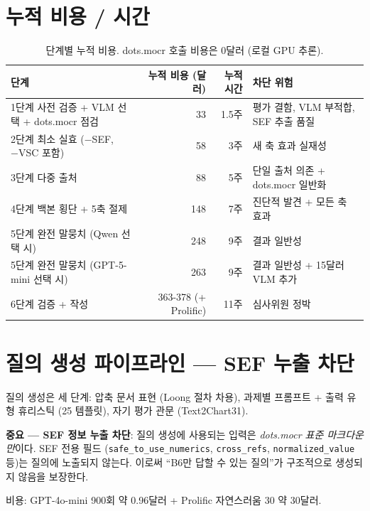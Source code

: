 \documentclass[11pt]{article}
\begin{document}
\section{누적 비용 / 시간}

\begin{table}[h]
\centering
\small
\begin{tabular}{lrrl}
\toprule
단계 & 누적 비용 (달러) & 누적 시간 & 차단 위험 \\
\midrule
1단계 사전 검증 + VLM 선택 + dots.mocr 점검 & 33 & 1.5주 & 평가 결함, VLM 부적합, SEF 추출 품질 \\
2단계 최소 실효 (−SEF, −VSC 포함) & 58 & 3주 & 새 축 효과 실재성 \\
3단계 다중 출처 & 88 & 5주 & 단일 출처 의존 + dots.mocr 일반화 \\
4단계 백본 횡단 + 5축 절제 & 148 & 7주 & 진단적 발견 + 모든 축 효과 \\
5단계 완전 말뭉치 (Qwen 선택 시) & 248 & 9주 & 결과 일반성 \\
5단계 완전 말뭉치 (GPT-5-mini 선택 시) & 263 & 9주 & 결과 일반성 + 15달러 VLM 추가 \\
6단계 검증 + 작성 & 363-378 (+ Prolific) & 11주 & 심사위원 정박 \\
\bottomrule
\end{tabular}
\caption{단계별 누적 비용. dots.mocr 호출 비용은 0달러 (로컬 GPU 추론).}
\end{table}

\section{질의 생성 파이프라인 — SEF 누출 차단}
\label{sec:querygen}

질의 생성은 세 단계: 압축 문서 표현 (Loong 절차 차용), 과제별 프롬프트 + 출력 유형 휴리스틱 (25 템플릿), 자기 평가 관문 (Text2Chart31).

\textbf{중요 — SEF 정보 누출 차단}: 질의 생성에 사용되는 입력은 \emph{dots.mocr 표준 마크다운만}이다. SEF 전용 필드 (\texttt{safe\_to\_use\_numerics}, \texttt{cross\_refs}, \texttt{normalized\_value} 등)는 질의에 노출되지 않는다. 이로써 ``B6만 답할 수 있는 질의''가 구조적으로 생성되지 않음을 보장한다.

비용: GPT-4o-mini 900회 약 0.96달러 + Prolific 자연스러움 30 약 30달러.
\end{document}
